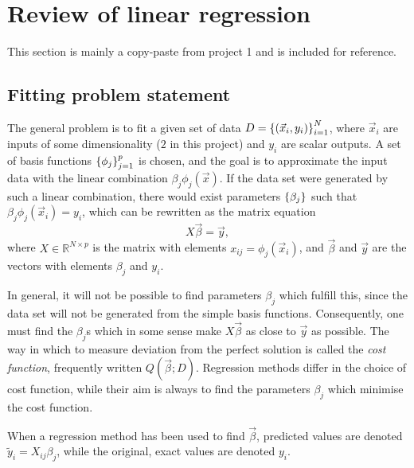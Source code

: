 \documentclass[11pt,british,a4paper]{article}
\numberwithin{equation}{section}
\begin{document}
\section{Review of linear regression}\label{sec:linreg}
This section is mainly a copy-paste from project 1 and is included for reference.
\subsection{Fitting problem statement}
The general problem is to fit a given set of data \(D=\qty{(\vec{x}_i,y_i)}_{i=1}^N\), where \(\vec{x}_i\) are inputs of some dimensionality (\(2\) in this project) and \(y_i\) are scalar outputs.
A set of basis functions \(\qty{\phi_j}_{j=1}^p\) is chosen, and the goal is to approximate the input data with the linear combination \(\beta_j \phi_j(\vec{x})\).
If the data set were generated by such a linear combination, there would exist parameters \(\qty{\beta_j}\) such that \(\beta_j\phi_j(\vec{x}_i)=y_i\), which can be rewritten as the matrix equation
\begin{equation}
    X\vec{\beta} = \vec{y},
\end{equation}
where \(X\in\mathbb{R}^{N\times p}\) is the matrix with elements \(x_{ij}=\phi_j(\vec{x}_i)\), and \(\vec{\beta}\) and \(\vec{y}\) are the vectors with elements \(\beta_j\) and \(y_i\).

In general, it will not be possible to find parameters \(\beta_j\) which fulfill this, since the data set will not be generated from the simple basis functions.
Consequently, one must find the \(\beta_j\)s which in some sense make \(X\vec{\beta}\) as close to \(\vec{y}\) as possible.
The way in which to measure deviation from the perfect solution is called the \emph{cost function}, frequently written \(Q(\vec{\beta};D)\).
Regression methods differ in the choice of cost function, while their aim is always to find the parameters \(\beta_j\) which minimise the cost function.

When a regression method has been used to find \(\vec{\beta}\), predicted values are denoted \(\tilde{y}_i = X_{ij}\beta_j\), while the original, exact values are denoted \(y_i\).

\end{document}

